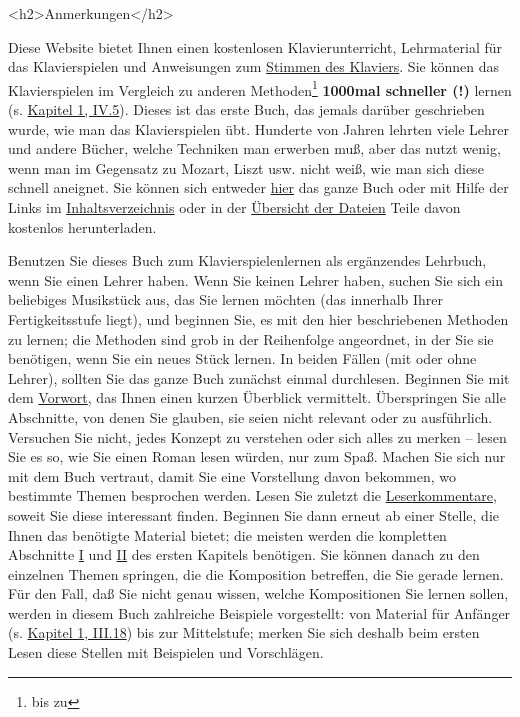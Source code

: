 
\label{anmerkungen}

<h2>Anmerkungen</h2>

Diese Website bietet Ihnen einen kostenlosen Klavierunterricht, Lehrmaterial für das Klavierspielen und Anweisungen zum \hyperref[c2_1]{Stimmen des Klaviers}.
Sie können das Klavierspielen im Vergleich zu anderen Methoden\footnote{bis zu} \textbf{1000mal schneller (!)} lernen (s. \hyperref[c1iv5]{Kapitel 1, IV.5}).
Dieses ist das erste Buch, das jemals darüber geschrieben wurde, wie man das Klavierspielen übt.
Hunderte von Jahren lehrten viele Lehrer und andere Bücher, welche Techniken man erwerben muß, aber das nutzt wenig, wenn man im Gegensatz zu Mozart, Liszt usw. nicht weiß, wie man sich diese schnell aneignet.
Sie können sich entweder \hyperref[copy]{hier} das ganze Buch oder mit Hilfe der Links im \hyperref[Inhalt]{Inhaltsverzeichnis} oder in der \hyperref[./dateien.html\#copy]{Übersicht der Dateien} Teile davon kostenlos herunterladen.

Benutzen Sie dieses Buch zum Klavierspielenlernen als ergänzendes Lehrbuch, wenn Sie einen Lehrer haben.
Wenn Sie keinen Lehrer haben, suchen Sie sich ein beliebiges Musikstück aus, das Sie lernen möchten (das innerhalb Ihrer Fertigkeitsstufe liegt), und beginnen Sie, es mit den hier beschriebenen Methoden zu lernen; die Methoden sind grob in der Reihenfolge angeordnet, in der Sie sie benötigen, wenn Sie ein neues Stück lernen.
In beiden Fällen (mit oder ohne Lehrer), sollten Sie das ganze Buch zunächst einmal durchlesen.
Beginnen Sie mit dem \hyperref[preface]{Vorwort}, das Ihnen einen kurzen Überblick vermittelt.
Überspringen Sie alle Abschnitte, von denen Sie glauben, sie seien nicht relevant oder zu ausführlich.
Versuchen Sie nicht, jedes Konzept zu verstehen oder sich alles zu merken -- lesen Sie es so, wie Sie einen Roman lesen würden, nur zum Spaß.
Machen Sie sich nur mit dem Buch vertraut, damit Sie eine Vorstellung davon bekommen, wo bestimmte Themen besprochen werden.
Lesen Sie zuletzt die \hyperref[testimonials]{Leserkommentare}, soweit Sie diese interessant finden.
Beginnen Sie dann erneut ab einer Stelle, die Ihnen das benötigte Material bietet; die meisten werden die kompletten Abschnitte \hyperref[c1i1]{I} und \hyperref[c1ii1]{II} des ersten Kapitels benötigen.
Sie können danach zu den einzelnen Themen springen, die die Komposition betreffen, die Sie gerade lernen.
Für den Fall, daß Sie nicht genau wissen, welche Kompositionen Sie lernen sollen, werden in diesem Buch zahlreiche Beispiele vorgestellt: von Material für Anfänger (s. \hyperref[c1iii18]{Kapitel 1, III.18}) bis zur Mittelstufe; merken Sie sich deshalb beim ersten Lesen diese Stellen mit Beispielen und Vorschlägen.

